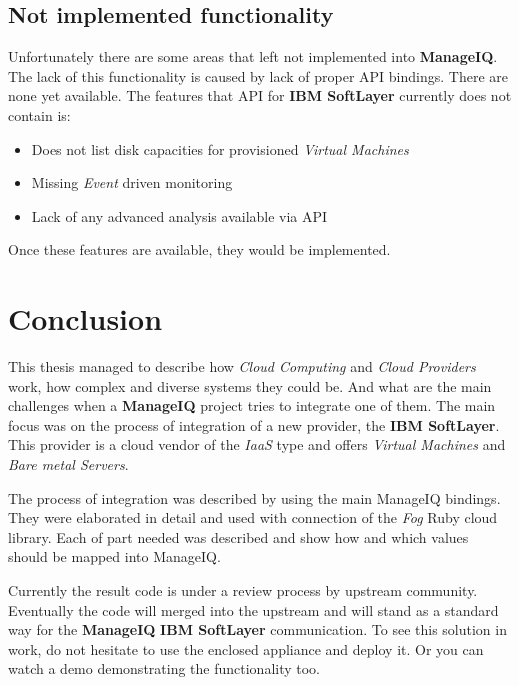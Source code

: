 \section{Not implemented functionality}
\label{sec:Not implemented functionality}

Unfortunately there are some areas that left not implemented into \textbf{ManageIQ}. The lack of this functionality is caused by lack of proper API bindings. There are none yet available. The features that API for \textbf{IBM SoftLayer} currently does not contain is:

\begin{itemize}
	\item Does not list disk capacities for provisioned \emph{Virtual Machines}
	\item Missing \emph{Event} driven monitoring
	\item Lack of any advanced analysis available via API
\end{itemize}

Once these features are available, they would be implemented.

\chapter{Conclusion}
\label{chap:Conclusion}

This thesis managed to describe how \emph{Cloud Computing} and \emph{Cloud Providers} work, how complex and diverse systems they could be. And what are the main challenges when a \textbf{ManageIQ} project tries to integrate one of them. The main focus was on the process of integration of a new provider, the \textbf{IBM SoftLayer}. This provider is a cloud vendor of the \emph{IaaS} type and offers \emph{Virtual Machines} and \emph{Bare metal Servers}.

The process of integration was described by using the main ManageIQ bindings. They were elaborated in detail and used with connection of the \emph{Fog} Ruby cloud library. Each of part needed was described and show how and which values should be mapped into {ManageIQ}.

Currently the result code is under a review process by upstream community. Eventually the code will merged into the upstream and will stand as a standard way for the \textbf{ManageIQ} \textbf{IBM SoftLayer} communication. To see this solution in work, do not hesitate to use the enclosed appliance and deploy it. Or you can watch a demo demonstrating the functionality too.
